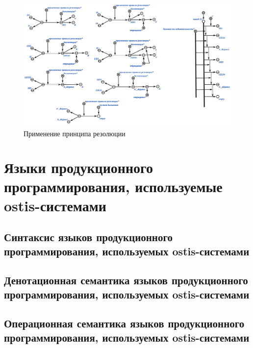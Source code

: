 \begin{figure}[H]
	\includegraphics[scale=0.7]{author/part3/figures/resolution_inference.png}
	\caption{Применение принципа резолюции}
	\label{fig:resolution_inference}
\end{figure}


\section{Языки продукционного программирования, используемые ostis-системами}
\subsection{Синтаксис языков продукционного программирования, используемых ostis-системами}
\subsection{Денотационная семантика языков продукционного программирования, используемых ostis-системами}
\subsection{Операционная семантика языков продукционного программирования, используемых ostis-системами}

%